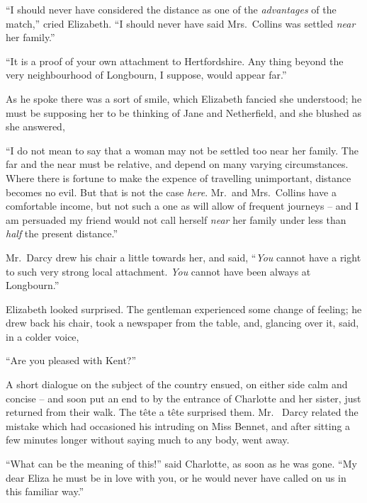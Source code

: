 “I should never have considered the distance as one
of the \textit{advantages} of the match,” cried Elizabeth. “I
should never have said Mrs.\ Collins was settled \textit{near} her
family.”

“It is a proof of your own attachment to Hertfordshire.
Any thing beyond the very neighbourhood of
Longbourn, I suppose, would appear far.”

As he spoke there was a sort of smile, which Elizabeth
fancied she understood; he must be supposing her to be
thinking of Jane and Netherfield, and she blushed as she
answered,

“I do not mean to say that a woman may not be
settled too near her family. The far and the near must
be relative, and depend on many varying circumstances.
Where there is fortune to make the expence of travelling
unimportant, distance becomes no evil. But that is not
the case \textit{here}. Mr.\ and Mrs.\ Collins have a comfortable
income, but not such a one as will allow of frequent
journeys -- and I am persuaded my friend would not call
herself \textit{near} her family under less than \textit{half} the present
distance.”

Mr.\ Darcy drew his chair a little towards her, and
said, “\textit{You} cannot have a right to such very strong
local attachment. \textit{You} cannot have been always at
Longbourn.”

Elizabeth looked surprised. The gentleman experienced
some change of feeling; he drew back his chair, took
a newspaper from the table, and, glancing over it, said,
in a colder voice,

“Are you pleased with Kent?”

A short dialogue on the subject of the country ensued,
on either side calm and concise -- and soon put an end to
by the entrance of Charlotte and her sister, just returned
from their walk. The tête a tête surprised them. Mr.\ %
Darcy related the mistake which had occasioned his intruding
on Miss Bennet, and after sitting a few minutes
longer without saying much to any body, went away.

“What can be the meaning of this!” said Charlotte,
as soon as he was gone. “My dear Eliza he must be
in love with you, or he would never have called on us in
this familiar way.”

